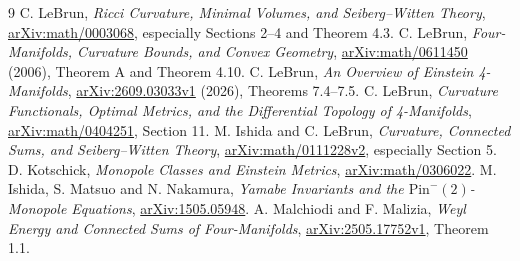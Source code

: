 \documentclass[11pt]{article}
\theoremstyle{remark}
\begin{document}
\begin{thebibliography}{9}
 C. LeBrun,
\emph{Ricci Curvature, Minimal Volumes, and Seiberg--Witten Theory},
\href{https://arxiv.org/abs/math/0003068}{arXiv:math/0003068},
especially Sections 2--4 and Theorem 4.3.
 C. LeBrun,
\emph{Four-Manifolds, Curvature Bounds, and Convex Geometry},
\href{https://arxiv.org/abs/math/0611450}{arXiv:math/0611450} (2006),
Theorem A and Theorem 4.10.
 C. LeBrun,
\emph{An Overview of Einstein 4-Manifolds},
\href{https://arxiv.org/abs/2609.03033v1}{arXiv:2609.03033v1} (2026),
Theorems 7.4--7.5.
 C. LeBrun,
\emph{Curvature Functionals, Optimal Metrics, and the Differential
Topology of 4-Manifolds},
\href{https://arxiv.org/abs/math/0404251}{arXiv:math/0404251}, Section 11.
 M. Ishida and C. LeBrun,
\emph{Curvature, Connected Sums, and Seiberg--Witten Theory},
\href{https://arxiv.org/abs/math/0111228v2}{arXiv:math/0111228v2},
especially Section 5.
 D. Kotschick,
\emph{Monopole Classes and Einstein Metrics},
\href{https://arxiv.org/abs/math/0306022}{arXiv:math/0306022}.
 M. Ishida, S. Matsuo and N. Nakamura,
\emph{Yamabe Invariants and the $\mathrm{Pin}^{-}(2)$-Monopole Equations},
\href{https://arxiv.org/abs/1505.05948}{arXiv:1505.05948}.
 A. Malchiodi and F. Malizia,
\emph{Weyl Energy and Connected Sums of Four-Manifolds},
\href{https://arxiv.org/abs/2505.17752v1}{arXiv:2505.17752v1},
Theorem 1.1.
\end{thebibliography}
\end{document}
